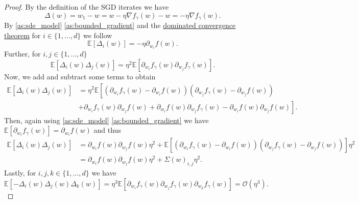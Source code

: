 \documentclass[12pt]{article}
\theoremstyle{definition}
\numberwithin{equation}{section}
\newcommand{\CO}{\mathcal{O}}
\newcommand{\ev}[1]{\mathbb{E}\left[{#1}\right]}
\begin{document}
\begin{proof}
  By the definition of the SGD iterates we have
  \begin{equation*}
    \Delta(w) = w_{1} - w = w - \eta \nabla f_{\gamma}(w) - w = - \eta \nabla f_{\gamma}(w).
  \end{equation*}
  By \autoref{as:sde_model} \ref{as:bounded_gradient} and the \hyperref[thm:dominated_convergence]{dominated convergence theorem} for $i \in \{1,\dots,d\}$ we follow
  \begin{equation*}
    \ev{\Delta_{i}(w)} = - \eta \partial_{w_i} f(w).
  \end{equation*}
  Further, for  $i,j \in \{1,\dots,d\}$
  \begin{equation*}
    \ev{\Delta_{i}(w)\Delta_{j}(w)} = \eta^2 \ev{\partial_{w_i}f_{\gamma}(w)\partial_{w_j}f_{\gamma}(w)}.
  \end{equation*}
  Now, we add and subtract some terms to obtain 
  \begin{align*}
    \ev{\Delta_{i}(w)\Delta_{j}(w)}
    &= \eta^2 \mathbb{E}\left[(\partial_{w_i}f_{\gamma}(w)- \partial_{w_i}f(w))(\partial_{w_j}f_{\gamma}(w) - \partial_{w_j}f(w)) \right. \\
    &+ \left. \partial_{w_i}f_{\gamma}(w)\partial_{w_j}f(w) + \partial_{w_i}f(w)\partial_{w_j}f_{\gamma}(w) - \partial_{w_i}f(w)\partial_{w_j}f(w) \right].
  \end{align*}
  Then, again using \autoref{as:sde_model} \ref{as:bounded_gradient} we have $\ev{\partial_{w_i}f_\gamma(w)} = \partial_{w_i}f(w)$ and thus
  \begin{align*}
    \ev{\Delta_{i}(w)\Delta_{j}(w)} &= \partial_{w_i} f(w)\partial_{w_j} f(w) \eta^2 + \ev{(\partial_{w_i}f_{\gamma}(w)- \partial_{w_i}f(w))(\partial_{w_j}f_{\gamma}(w) - \partial_{w_j}f(w))}\eta^2 \\
    &= \partial_{w_i} f(w)\partial_{w_j} f(w) \eta^2 + \Sigma(w)_{i,j}\eta^2.
  \end{align*}
  Lastly, for $i,j,k \in \{1,\dots,d\}$ we have
  \begin{equation*}
    \ev{-\Delta_{i}(w)\Delta_{j}(w)\Delta_{k}(w)} = \eta^3 \ev{\partial_{w_i}f_{\gamma}(w)\partial_{w_j}f_{\gamma}(w)\partial_{w_k}f_{\gamma}(w)} = \CO(\eta^3).
  \end{equation*}
\end{proof}
\end{document}
